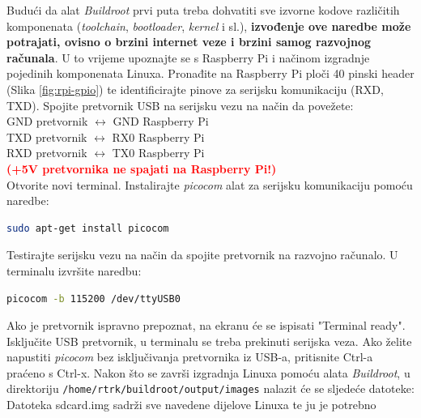 \documentclass[11pt]{article}
\begin{document}
Budući da alat \textit{Buildroot} prvi puta treba dohvatiti sve izvorne kodove
 različitih komponenata (\textit{toolchain}, \textit{bootloader}, \textit{kernel}
 i sl.), \textbf{izvođenje ove naredbe može potrajati, ovisno o brzini internet
 veze i brzini samog razvojnog računala}. U to vrijeme upoznajte se s Raspberry
 Pi i načinom izgradnje pojedinih komponenata Linuxa.
\newline
\newline
Pronađite na Raspberry Pi ploči 40 pinski header (Slika \ref{fig:rpi-gpio}) te
 identificirajte pinove za serijsku komunikaciju (RXD, TXD). Spojite pretvornik
 USB na serijsku vezu na način da povežete:\\
\newline
GND pretvornik $\leftrightarrow$ GND Raspberry Pi \\
TXD pretvornik $\leftrightarrow$ RX0 Raspberry Pi \\
RXD pretvornik $\leftrightarrow$ TX0 Raspberry Pi \\
\textbf{\textcolor{red}{(+5V pretvornika ne spajati na Raspberry Pi!)}} \\
\newline
Otvorite novi terminal. Instalirajte \textit{picocom} alat za serijsku
 komunikaciju pomoću naredbe:
\begin{lstlisting}[language=bash]
sudo apt-get install picocom
\end{lstlisting}
Testirajte serijsku vezu na način da spojite pretvornik na razvojno računalo. U
 terminalu izvršite naredbu:
\begin{lstlisting}[language=bash]
picocom -b 115200 /dev/ttyUSB0
\end{lstlisting}
Ako je pretvornik ispravno prepoznat, na ekranu će se ispisati "Terminal ready".
 Isključite USB pretvornik, u terminalu se treba prekinuti serijska veza. Ako
 želite napustiti \textit{picocom} bez isključivanja pretvornika iz USB-a,
 pritisnite Ctrl-a praćeno s Ctrl-x.
\newline
\newline
Nakon što se završi izgradnja Linuxa pomoću alata \textit{Buildroot}, u
 direktoriju \texttt{/home/rtrk/buildroot/output/images} nalazit će se sljedeće
 datoteke:
\newline
{}%
Datoteka sdcard.img sadrži sve navedene dijelove Linuxa te ju je potrebno
\end{document}
